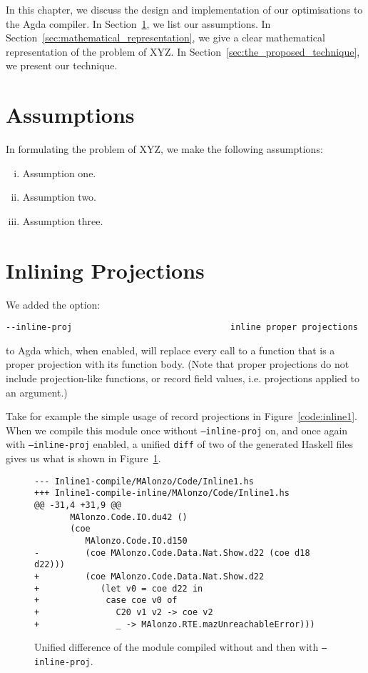 In this chapter, we discuss the design and implementation of our optimisations to the Agda compiler. In Section~\ref{sec:assumptions}, we list our assumptions. In Section~\ref{sec:mathematical_representation}, we give a clear mathematical representation of the problem of XYZ. In Section~\ref{sec:the_proposed_technique}, we present our technique. 

\section{Assumptions}
\label{sec:assumptions}

In formulating the problem of XYZ, we make the following assumptions: 
\begin{enumerate}[(i)]
	\item Assumption one. 
	\item Assumption two. 
	\item Assumption three. 
\end{enumerate}


\section{Inlining Projections}
\label{sec:inlining_projections}

We added the option:

\begin{verbatim}
--inline-proj                               inline proper projections
\end{verbatim}

to Agda which, when enabled, will replace every call to a function that is a proper projection with its function body. (Note that proper projections do not include projection-like functions, or record field values, i.e. projections applied to an argument.)



Take for example the simple usage of record projections in Figure~\ref{code:inline1}. When we compile this module once without \texttt{--inline-proj} on, and once again with \texttt{--inline-proj} enabled, a unified \texttt{diff} of two of the generated Haskell files gives us what is shown in Figure~\ref{fig:inline1_diff}.

\begin{figure}
\begin{verbatim}
--- Inline1-compile/MAlonzo/Code/Inline1.hs
+++ Inline1-compile-inline/MAlonzo/Code/Inline1.hs
@@ -31,4 +31,9 @@
       MAlonzo.Code.IO.du42 ()
       (coe
          MAlonzo.Code.IO.d150
-         (coe MAlonzo.Code.Data.Nat.Show.d22 (coe d18 d22)))
+         (coe MAlonzo.Code.Data.Nat.Show.d22
+            (let v0 = coe d22 in
+             case coe v0 of
+               C20 v1 v2 -> coe v2
+               _ -> MAlonzo.RTE.mazUnreachableError)))
\end{verbatim}

\caption{Unified difference of the  module compiled without and then with \texttt{--inline-proj}.}
\label{fig:inline1_diff}
\end{figure}

